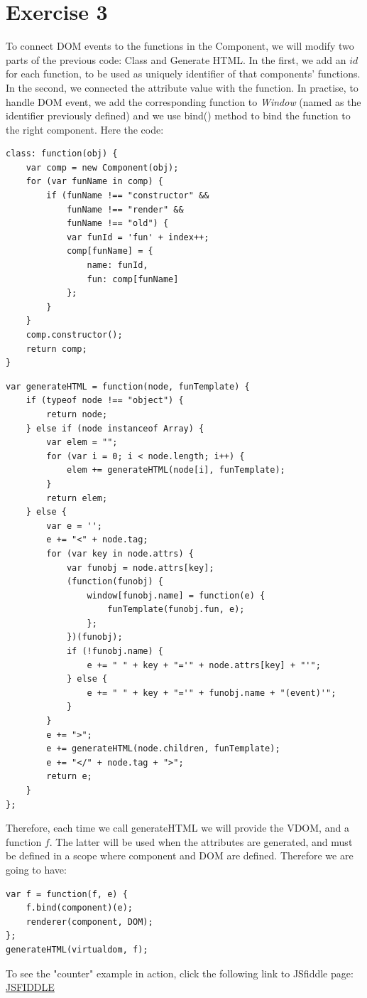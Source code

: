 \documentclass[10pt]{article}
\begin{document}
\section*{Exercise 3}
To connect DOM events to the functions in the Component, we will modify two parts of the previous code: Class and Generate HTML. In the first, we add an $id$ for each function, to be used as uniquely identifier of that components' functions. In the second, we connected the attribute value with the function. In practise, to handle DOM event, we add the corresponding function to \textit{Window} (named as the identifier previously defined) and we use bind() method to bind the function to the right component. Here the code: 
\begin{lstlisting}[caption=New class]
class: function(obj) {
    var comp = new Component(obj);
    for (var funName in comp) {
        if (funName !== "constructor" &&
            funName !== "render" &&
            funName !== "old") {
            var funId = 'fun' + index++;
            comp[funName] = {
                name: funId,
                fun: comp[funName]
            };
        }
    }
    comp.constructor();
    return comp;
}
\end{lstlisting}  
\begin{lstlisting}[caption=New generateHTML]
var generateHTML = function(node, funTemplate) {
    if (typeof node !== "object") {
        return node;
    } else if (node instanceof Array) {
        var elem = "";
        for (var i = 0; i < node.length; i++) {
            elem += generateHTML(node[i], funTemplate);
        }
        return elem;
    } else {
        var e = '';
        e += "<" + node.tag;
        for (var key in node.attrs) {
            var funobj = node.attrs[key];
            (function(funobj) {
                window[funobj.name] = function(e) {
                    funTemplate(funobj.fun, e);
                };
            })(funobj);
            if (!funobj.name) {
                e += " " + key + "='" + node.attrs[key] + "'";
            } else {
                e += " " + key + "='" + funobj.name + "(event)'";
            }
        }
        e += ">";
        e += generateHTML(node.children, funTemplate);
        e += "</" + node.tag + ">";
        return e;
    }
};
\end{lstlisting}   
Therefore, each time we call generateHTML we will provide the VDOM, and a function $f$. The latter will be used when the attributes are generated, and must be defined in a scope where component and DOM are defined. Therefore we are going to have:
\begin{lstlisting}[caption=how to call generate HTML]
var f = function(f, e) {
    f.bind(component)(e);
    renderer(component, DOM);
};
generateHTML(virtualdom, f);
\end{lstlisting}   
To see the "counter" example in action, click the following link to JSfiddle page: \href{https://jsfiddle.net/bywqrjwc/}{JSFIDDLE}
\end{document}
